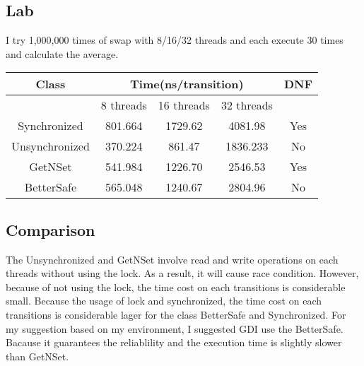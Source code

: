 \documentclass[10pt, a4paper]{IEEEtran}
\begin{document}
    \subsection{Lab}
    I try 1,000,000 times of swap with 8/16/32 threads and each execute 30 times and calculate the average.
    \begin{tabular}{|c|c|c|c|c|}
        \hline
        Class&\multicolumn{3}{c|}{Time(ns/transition)}&DNF\\
        \hline
        &8 threads&16 threads&32 threads&\\
        \hline
        Synchronized&801.664 &1729.62 &4081.98&Yes \\
        \hline
        Unsynchronized&370.224 &861.47 &1836.233&No\\
        \hline
        GetNSet&541.984 &1226.70 &2546.53&Yes\\
        \hline
        BetterSafe&565.048 &1240.67 &2804.96&No\\
        \hline
    \end{tabular}
    \subsection{Comparison}
    The Unsynchronized and GetNSet involve read and write operations on each threads without using the lock. As a result, it will cause race condition. However, because of not using the lock, the time cost on each transitions is considerable small.
    Because the usage of lock and synchronized, the time cost on each transitions is considerable lager for the class BetterSafe and Synchronized.
    For my suggestion based on my environment, I suggested GDI use the BetterSafe. Bacause it guarantees the reliablility and the execution time is slightly slower than GetNSet.
\end{document}
